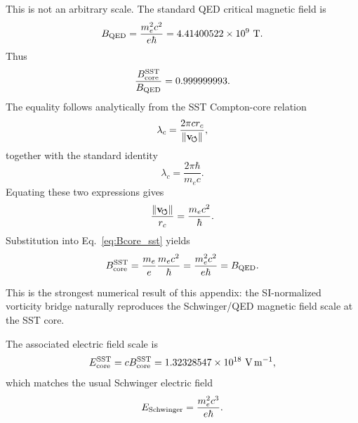     This is not an arbitrary scale.  The standard QED critical magnetic field
    is
    \begin{equation}
        B_{\rm QED}
        =
        \frac{m_e^2c^2}{e\hbar}
        =
        4.41400522\times10^{9}\ {\rm T}.
        \label{eq:Bqed}
    \end{equation}
    Thus
    \begin{equation}
        \frac{B_{\rm core}^{\rm SST}}{B_{\rm QED}}
        =
        0.999999993.
        \label{eq:Bcore_Bqed_ratio}
    \end{equation}
    The equality follows analytically from the SST Compton-core relation
    \begin{equation}
        \lambda_c
        =
        \frac{2\pi cr_c}{\lVert\mathbf{v}_{\!\boldsymbol{\circlearrowleft}}\rVert},
        \label{eq:compton_core_relation}
    \end{equation}
    together with the standard identity
    \begin{equation}
        \lambda_c
        =
        \frac{2\pi\hbar}{m_ec}.
    \end{equation}
    Equating these two expressions gives
    \begin{equation}
        \frac{\lVert\mathbf{v}_{\!\boldsymbol{\circlearrowleft}}\rVert}{r_c}
        =
        \frac{m_ec^2}{\hbar}.
        \label{eq:omega_core_compton}
    \end{equation}
    Substitution into Eq.~\eqref{eq:Bcore_sst} yields
    \begin{equation}
        B_{\rm core}^{\rm SST}
        =
        \frac{m_e}{e}
        \frac{m_ec^2}{\hbar}
        =
        \frac{m_e^2c^2}{e\hbar}
        =
        B_{\rm QED}.
        \label{eq:Bcore_equals_Bqed}
    \end{equation}
    
    This is the strongest numerical result of this appendix: the SI-normalized
    vorticity bridge naturally reproduces the Schwinger/QED magnetic field
    scale at the SST core.
    
    The associated electric field scale is
    \begin{equation}
        E_{\rm core}^{\rm SST}
        =
        cB_{\rm core}^{\rm SST}
        =
        1.32328547\times10^{18}\ {\rm V\,m^{-1}},
        \label{eq:Ecore_numeric}
    \end{equation}
    which matches the usual Schwinger electric field
    \begin{equation}
        E_{\rm Schwinger}
        =
        \frac{m_e^2c^3}{e\hbar}.
        \label{eq:Schwinger_field}
    \end{equation}

